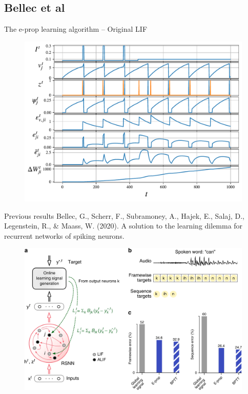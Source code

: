 \documentclass[t]{beamer}
\begin{document}
\subsection{Bellec et al}

\begin{frame}{The e-prop learning algorithm -- Original LIF}
	
	\begin{figure}[!ht]
		\includegraphics[width=0.8\linewidth]{demo_bellec_lif.pdf}
	\end{figure}
	
\end{frame}

\begin{frame}{Previous results}
\tiny{
Bellec, G., Scherr, F., Subramoney, A., Hajek, E., Salaj, D., Legenstein, R., \& Maass, W. (2020). A solution to the learning dilemma for recurrent networks of spiking neurons.}
	
\begin{figure}[!ht]
		\includegraphics[width=0.8\linewidth]{timitperformance.png}
	\end{figure}
	
\end{frame}
\end{document}
